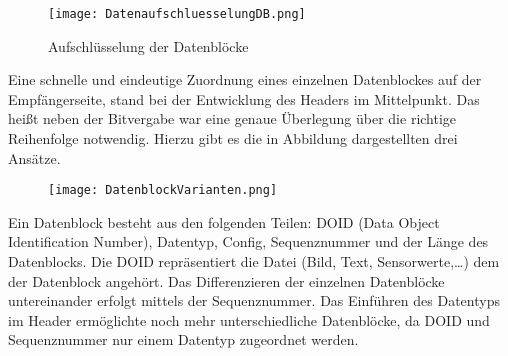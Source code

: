 \begin{figure}[H]
	\centering
	\texttt{[image: DatenaufschluesselungDB.png]}
	\caption{Aufschlüsselung der Datenblöcke}
  \label{fig:DatenaufschluesselungDB}
\end{figure}


 Eine schnelle und eindeutige
Zuordnung eines einzelnen Datenblockes auf der Empfängerseite, stand bei der
Entwicklung des Headers im Mittelpunkt. Das heißt neben der Bitvergabe war eine
genaue Überlegung über die richtige Reihenfolge notwendig. Hierzu gibt es die in
Abbildung dargestellten drei Ansätze.


\begin{figure}[H]
	\centering
	\texttt{[image: DatenblockVarianten.png]}
\end{figure}

Ein Datenblock besteht aus den folgenden Teilen: DOID (Data Object
Identification Number), Datentyp, Config, Sequenznummer und der Länge des
Datenblocks. Die DOID repräsentiert die Datei (Bild, Text, Sensorwerte,\ldots)
dem der Datenblock angehört. Das Differenzieren der einzelnen Datenblöcke
untereinander erfolgt mittels der Sequenznummer. Das Einführen des Datentyps im
Header ermöglichte noch mehr unterschiedliche Datenblöcke, da DOID und
Sequenznummer nur einem Datentyp zugeordnet werden.

